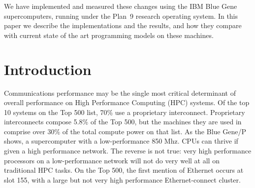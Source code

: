 \documentclass[letterpaper,twocolumn,10pt]{article}
\begin{document}
We have implemented and measured these changes using the IBM Blue Gene supercomputers, running under the Plan~9 research operating system. 
In this paper we describe the implementations and the results, and how they compare with current state of the art programming models on these machines. 
%
%

\section{Introduction}
Communications performance may be the single most critical determinant of overall performance on High Performance Computing (HPC) systems. Of the top 10 systems on the Top 500 list, 70\% use a proprietary interconnect. Proprietary interconnects compose 5.8\% of the Top 500, but the machines they are used in comprise over 30\% of the total compute power on that list. 
As the Blue Gene/P shows, a supercomputer with a low-performance 850 Mhz. CPUs can thrive if given a high performance network. The reverse is not true: very high performance processors on a low-performance network will not do very well at all on traditional HPC tasks. On the Top 500, the first 
mention of Ethernet occurs at slot 155, with a large but not very high performance Ethernet-connect cluster. 
\end{document}
